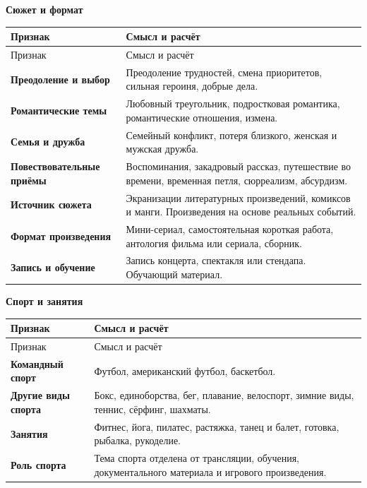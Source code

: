 \documentclass[11pt,a4paper]{article}
\begin{document}
\textbf{Сюжет и формат}


\begin{longtable}{>{\raggedright\arraybackslash}p{4.1cm}>{\raggedright\arraybackslash}p{10.8cm}}
\toprule
Признак & Смысл и расчёт \\
\midrule
\endfirsthead
\toprule
Признак & Смысл и расчёт \\
\midrule
\endhead
\textbf{Преодоление и выбор} & Преодоление трудностей, смена приоритетов, сильная героиня, добрые дела. \\[4pt]
\textbf{Романтические темы} & Любовный треугольник, подростковая романтика, романтические отношения, измена. \\[4pt]
\textbf{Семья и дружба} & Семейный конфликт, потеря близкого, женская и мужская дружба. \\[4pt]
\textbf{Повествовательные приёмы} & Воспоминания, закадровый рассказ, путешествие во времени, временная петля, сюрреализм, абсурдизм. \\[4pt]
\textbf{Источник сюжета} & Экранизации литературных произведений, комиксов и манги. Произведения на основе реальных событий. \\[4pt]
\textbf{Формат произведения} & Мини-сериал, самостоятельная короткая работа, антология фильма или сериала, сборник. \\[4pt]
\textbf{Запись и обучение} & Запись концерта, спектакля или стендапа. Обучающий материал. \\[4pt]
\bottomrule
\end{longtable}

\textbf{Спорт и занятия}


\begin{longtable}{>{\raggedright\arraybackslash}p{4.1cm}>{\raggedright\arraybackslash}p{10.8cm}}
\toprule
Признак & Смысл и расчёт \\
\midrule
\endfirsthead
\toprule
Признак & Смысл и расчёт \\
\midrule
\endhead
\textbf{Командный спорт} & Футбол, американский футбол, баскетбол. \\[4pt]
\textbf{Другие виды спорта} & Бокс, единоборства, бег, плавание, велоспорт, зимние виды, теннис, сёрфинг, шахматы. \\[4pt]
\textbf{Занятия} & Фитнес, йога, пилатес, растяжка, танец и балет, готовка, рыбалка, рукоделие. \\[4pt]
\textbf{Роль спорта} & Тема спорта отделена от трансляции, обучения, документального материала и игрового произведения. \\[4pt]
\bottomrule
\end{longtable}
\end{document}
